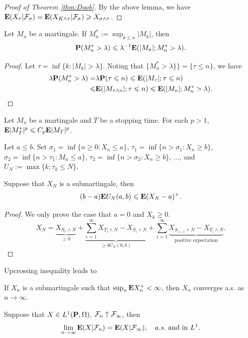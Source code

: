 	\begin{proof}[Proof of Theorem \ref{thm:Doob}]
		By the above lemma, we have ${\mathbf E} (X_{\tau}|{\mathcal F}_{\sigma})={\mathbf E} (X_{K\wedge \tau}|{\mathcal F}_{\sigma})\geqslant X_{\sigma\wedge \tau}$.  
	\end{proof}
	\begin{theorem}\label{Thm-Doob-Max}
		Let $M_n$ be a martingale. If $M_n^*:=\sup_{k\leq n} |M_k|$, then 
		$$
		{\mathbf P}(M^*_n>\lambda) \leqslant \lambda^{-1} {\mathbf E} (|M_n|;M_n^*>\lambda). 
		$$
	\end{theorem}
	\begin{proof}
		Let $\tau=\inf\{k: |M_k|>\lambda\}$.  Noting that $\{M^*_n>\lambda\}\}=\{\tau \leq n\}$, we have 
		\begin{align*}
			\begin{aligned}
				\lambda {\mathbf P} (M^*_n>\lambda)=&\lambda {\mathbf P}(\tau\leqslant n)\leqslant {\mathbf E}(|M_\tau|;\tau\leqslant n)\\
				\leqslant &{\mathbf E} (|M_{\tau 
					\wedge n}|; \tau\leqslant n) \leqslant  {\mathbf E}(|M_n|; M_n^*>\lambda). 
			\end{aligned}
		\end{align*}
	\end{proof}
	
	\begin{corollary}\label{Cor-Lp}
		Let $M_n$ be a martingale and $T$ be a stopping time. For each $p>1$, ${\mathbf E} |M_T^*|^p \leqslant C_p {\mathbf E} |M_T|^p$. 
	\end{corollary}
	
	 Let $a\leq b$. Set $\sigma_1=\inf\{n\geq 0: X_n\leq a\}$, $\tau_1= \inf\{n>\sigma_1: X_n\geq b\}$, $\sigma_2=\inf\{n>\tau_1: M_n\leq a\}$, $\tau_2= \inf\{n>\sigma_2: X_n\geq b\}$, $\dots$, and 
	$U_N:= \max\{k: \tau_k\leq N\}$. 
	\begin{lemma}
		Suppose that $X_N$ is a submartingale, then 
		\[
		(b-a){\mathbf E} U_N(a,b) \leqslant {\mathbf E} (X_{N}-a)^+. 
		\]
	\end{lemma}
	\begin{proof}
		We only prove the case that $a=0$ and $X_k\geq 0$. 
		\[
		X_N=\underbrace{X_{S_1\wedge N}}_{\geq 0}+\underbrace{\sum_{i=1}^\infty X_{T_i\wedge N}-X_{S_i\wedge N}}_{\geq bU_N(0,b)}+ \sum_{i=1}^\infty \underbrace{X_{S_{i+1}\wedge N}-X_{T_i\wedge N}}_{\mbox{positive expectation}}. 
		\] 
	\end{proof}
	Upcrossing inequality leads to 
	\begin{theorem}
		If $X_n$ is a submartingale such that $\sup_{n} {\mathbf E} X_n^{+}<\infty$, then $X_n$ converges a.s. as $n\to \infty$. 
	\end{theorem}
	\begin{corollary}\label{Cor-convergence}
		Suppose that $X\in L^1({\mathbf P}, \Omega)$, ${\mathcal F}_n\uparrow {\mathcal F}_\infty$, then 
		\[
		\lim_{n\to\infty}{\mathbf E} (X|{\mathcal F}_n) = {\mathbf E} (X|{\mathcal F}_\infty),\quad a.s. \mbox{ and in } L^1. 
		\]
	\end{corollary}


